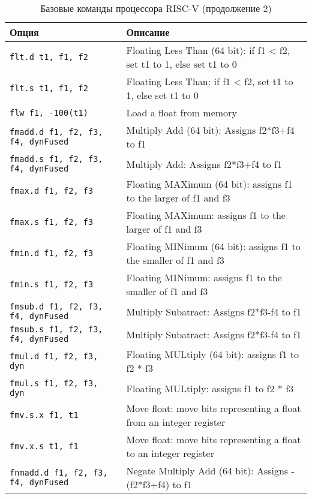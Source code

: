 \begin{table}[h]
    \caption{Базовые команды процессора RISC-V (продолжение 2)}
    \centering
    \begin{tabularx}{\textwidth}{|l|X|}
        \hline
        \textbf{Опция} & \textbf{Описание} \\
        \hline \hline
        \hline \verb|flt.d t1, f1, f2| & Floating Less Than (64 bit): if f1 < f2, set t1 to 1, else set t1 to 0 \\
        \hline \verb|flt.s t1, f1, f2| & Floating Less Than: if f1 < f2, set t1 to 1, else set t1 to 0 \\
        \hline \verb|flw f1, -100(t1)| & Load a float from memory \\
        \hline \verb|fmadd.d f1, f2, f3, f4, dynFused| & Multiply Add (64 bit): Assigns f2*f3+f4 to f1 \\
        \hline \verb|fmadd.s f1, f2, f3, f4, dynFused| & Multiply Add: Assigns f2*f3+f4 to f1 \\
        \hline \verb|fmax.d f1, f2, f3| & Floating MAXimum (64 bit): assigns f1 to the larger of f1 and f3 \\
        \hline \verb|fmax.s f1, f2, f3| & Floating MAXimum: assigns f1 to the larger of f1 and f3 \\
        \hline \verb|fmin.d f1, f2, f3| & Floating MINimum (64 bit): assigns f1 to the smaller of f1 and f3 \\
        \hline \verb|fmin.s f1, f2, f3| & Floating MINimum: assigns f1 to the smaller of f1 and f3 \\
        \hline \verb|fmsub.d f1, f2, f3, f4, dynFused| & Multiply Subatract: Assigns f2*f3-f4 to f1 \\
        \hline \verb|fmsub.s f1, f2, f3, f4, dynFused| & Multiply Subatract: Assigns f2*f3-f4 to f1 \\
        \hline \verb|fmul.d f1, f2, f3, dyn| & Floating MULtiply (64 bit): assigns f1 to f2 * f3 \\
        \hline \verb|fmul.s f1, f2, f3, dyn| & Floating MULtiply: assigns f1 to f2 * f3 \\
        \hline \verb|fmv.s.x f1, t1| & Move float: move bits representing a float from an integer register \\
        \hline \verb|fmv.x.s t1, f1| & Move float: move bits representing a float to an integer register \\
        \hline \verb|fnmadd.d f1, f2, f3, f4, dynFused| & Negate Multiply Add (64 bit): Assigns -(f2*f3+f4) to f1 \\

\end{tabularx}
\end{table}
